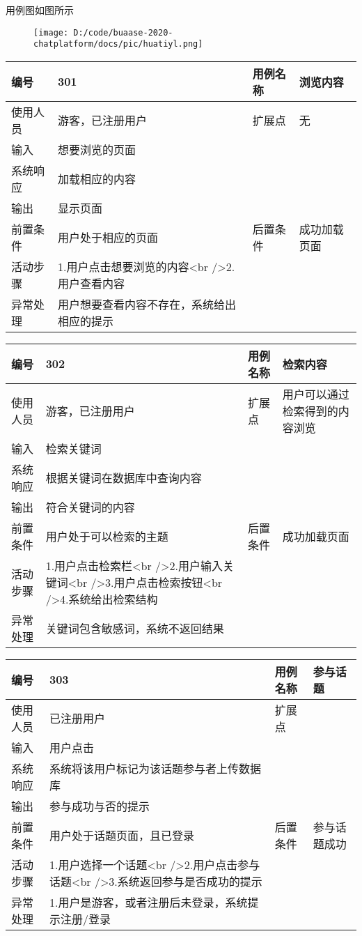 \documentclass[
]{article}
\begin{document}
用例图如图所示

\begin{figure}
\centering
\texttt{[image: D:/code/buaase-2020-chatplatform/docs/pic/huatiyl.png]}
\caption{}
\end{figure}

\begin{longtable}[]{@{}llll@{}}
\toprule
编号 & 301 & 用例名称 & 浏览内容\tabularnewline
\midrule
\endhead
使用人员 & 游客，已注册用户 & 扩展点 & 无\tabularnewline
输入 & 想要浏览的页面 & &\tabularnewline
系统响应 & 加载相应的内容 & &\tabularnewline
输出 & 显示页面 & &\tabularnewline
前置条件 & 用户处于相应的页面 & 后置条件 & 成功加载页面\tabularnewline
活动步骤 & 1.用户点击想要浏览的内容\textless br
/\textgreater{}2.用户查看内容 & &\tabularnewline
异常处理 & 用户想要查看内容不存在，系统给出相应的提示 & &\tabularnewline
\bottomrule
\end{longtable}

\begin{longtable}[]{@{}llll@{}}
\toprule
编号 & 302 & 用例名称 & 检索内容\tabularnewline
\midrule
\endhead
使用人员 & 游客，已注册用户 & 扩展点 &
用户可以通过检索得到的内容浏览\tabularnewline
输入 & 检索关键词 & &\tabularnewline
系统响应 & 根据关键词在数据库中查询内容 & &\tabularnewline
输出 & 符合关键词的内容 & &\tabularnewline
前置条件 & 用户处于可以检索的主题 & 后置条件 &
成功加载页面\tabularnewline
活动步骤 & 1.用户点击检索栏\textless br
/\textgreater{}2.用户输入关键词\textless br
/\textgreater{}3.用户点击检索按钮\textless br
/\textgreater{}4.系统给出检索结构 & &\tabularnewline
异常处理 & 关键词包含敏感词，系统不返回结果 & &\tabularnewline
\bottomrule
\end{longtable}

\begin{longtable}[]{@{}llll@{}}
\toprule
编号 & 303 & 用例名称 & 参与话题\tabularnewline
\midrule
\endhead
使用人员 & 已注册用户 & 扩展点 &\tabularnewline
输入 & 用户点击 & &\tabularnewline
系统响应 & 系统将该用户标记为该话题参与者上传数据库 & &\tabularnewline
输出 & 参与成功与否的提示 & &\tabularnewline
前置条件 & 用户处于话题页面，且已登录 & 后置条件 &
参与话题成功\tabularnewline
活动步骤 & 1.用户选择一个话题\textless br
/\textgreater{}2.用户点击参与话题\textless br
/\textgreater{}3.系统返回参与是否成功的提示 & &\tabularnewline
异常处理 & 1.用户是游客，或者注册后未登录，系统提示注册/登录 &
&\tabularnewline
\bottomrule
\end{longtable}
\end{document}
